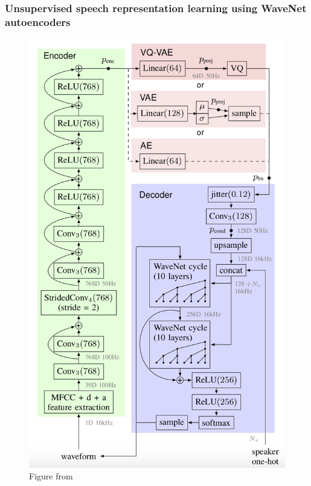 \documentclass[table]{beamer}
\begin{document}
\begin{frame}
\frametitle{Unsupervised speech representation learning using WaveNet autoencoders}


		\begin{figure}
			\centering
			\includegraphics[scale=0.22]	{wavnetAE} 
			\caption{Figure from  \citep{DBLP:journals/corr/abs-1901-08810}}
			\end{figure}

\end{frame}
\end{document}
